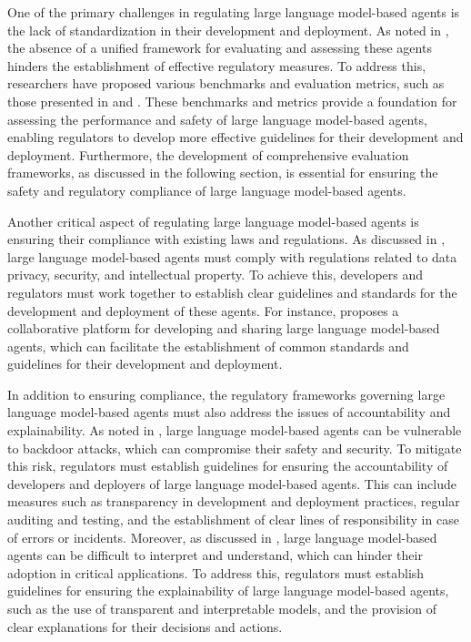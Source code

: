 \documentclass[11pt,a4paper]{article}
\begin{document}
One of the primary challenges in regulating large language model-based agents is the lack of standardization in their development and deployment. As noted in \cite{arxiv:2308.03688}, the absence of a unified framework for evaluating and assessing these agents hinders the establishment of effective regulatory measures. To address this, researchers have proposed various benchmarks and evaluation metrics, such as those presented in \cite{arxiv:2404.06411} and \cite{arxiv:2412.14470}. These benchmarks and metrics provide a foundation for assessing the performance and safety of large language model-based agents, enabling regulators to develop more effective guidelines for their development and deployment. Furthermore, the development of comprehensive evaluation frameworks, as discussed in the following section, is essential for ensuring the safety and regulatory compliance of large language model-based agents.

Another critical aspect of regulating large language model-based agents is ensuring their compliance with existing laws and regulations. As discussed in \cite{doi:10.18653/v1/2023.findings-emnlp.461}, large language model-based agents must comply with regulations related to data privacy, security, and intellectual property. To achieve this, developers and regulators must work together to establish clear guidelines and standards for the development and deployment of these agents. For instance, \cite{arxiv:2308.04030} proposes a collaborative platform for developing and sharing large language model-based agents, which can facilitate the establishment of common standards and guidelines for their development and deployment.

In addition to ensuring compliance, the regulatory frameworks governing large language model-based agents must also address the issues of accountability and explainability. As noted in \cite{arxiv:2402.11208}, large language model-based agents can be vulnerable to backdoor attacks, which can compromise their safety and security. To mitigate this risk, regulators must establish guidelines for ensuring the accountability of developers and deployers of large language model-based agents. This can include measures such as transparency in development and deployment practices, regular auditing and testing, and the establishment of clear lines of responsibility in case of errors or incidents. Moreover, as discussed in \cite{arxiv:2402.01108}, large language model-based agents can be difficult to interpret and understand, which can hinder their adoption in critical applications. To address this, regulators must establish guidelines for ensuring the explainability of large language model-based agents, such as the use of transparent and interpretable models, and the provision of clear explanations for their decisions and actions.
\end{document}
